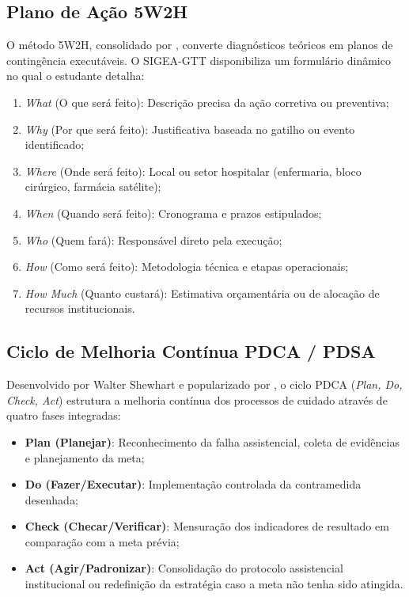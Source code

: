 \subsection{Plano de Ação 5W2H}
O método 5W2H, consolidado por , converte diagnósticos teóricos em planos de contingência executáveis. O SIGEA-GTT disponibiliza um formulário dinâmico no qual o estudante detalha:
\begin{enumerate}
    \item \textit{What} (O que será feito): Descrição precisa da ação corretiva ou preventiva;
    \item \textit{Why} (Por que será feito): Justificativa baseada no gatilho ou evento identificado;
    \item \textit{Where} (Onde será feito): Local ou setor hospitalar (enfermaria, bloco cirúrgico, farmácia satélite);
    \item \textit{When} (Quando será feito): Cronograma e prazos estipulados;
    \item \textit{Who} (Quem fará): Responsável direto pela execução;
    \item \textit{How} (Como será feito): Metodologia técnica e etapas operacionais;
    \item \textit{How Much} (Quanto custará): Estimativa orçamentária ou de alocação de recursos institucionais.
\end{enumerate}

\subsection{Ciclo de Melhoria Contínua PDCA / PDSA}
Desenvolvido por Walter Shewhart e popularizado por , o ciclo PDCA (\textit{Plan, Do, Check, Act}) estrutura a melhoria contínua dos processos de cuidado através de quatro fases integradas:
\begin{itemize}
    \item \textbf{Plan (Planejar)}: Reconhecimento da falha assistencial, coleta de evidências e planejamento da meta;
    \item \textbf{Do (Fazer/Executar)}: Implementação controlada da contramedida desenhada;
    \item \textbf{Check (Checar/Verificar)}: Mensuração dos indicadores de resultado em comparação com a meta prévia;
    \item \textbf{Act (Agir/Padronizar)}: Consolidação do protocolo assistencial institucional ou redefinição da estratégia caso a meta não tenha sido atingida.
\end{itemize}

